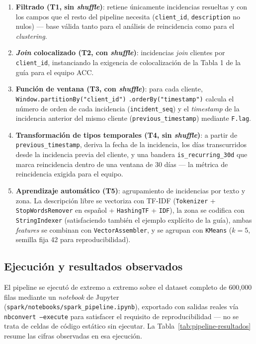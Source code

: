 \documentclass[11pt,letterpaper]{article}
\begin{document}
\begin{enumerate}[leftmargin=1.5em]
    \item \textbf{Filtrado (T1, sin \emph{shuffle})}: retiene únicamente incidencias resueltas y
        con los campos que el resto del pipeline necesita (\texttt{client\_id},
        \texttt{description} no nulos) — base válida tanto para el análisis de reincidencia como
        para el \emph{clustering}.
    \item \textbf{\emph{Join} colocalizado (T2, con \emph{shuffle})}: incidencias \emph{join}
        clientes por \texttt{client\_id}, instanciando la exigencia de colocalización de la
        Tabla 1 de la guía para el equipo ACC.
    \item \textbf{Función de ventana (T3, con \emph{shuffle})}: para cada cliente,
        \texttt{Window.partitionBy("client\_id")} \texttt{.orderBy("timestamp")} calcula el número de
        orden de cada incidencia (\texttt{incident\_seq}) y el \emph{timestamp} de la incidencia
        anterior del mismo cliente (\texttt{previous\_timestamp}) mediante \texttt{F.lag}.
    \item \textbf{Transformación de tipos temporales (T4, sin \emph{shuffle})}: a partir de
        \texttt{previous\_timestamp}, deriva la fecha de la incidencia, los días transcurridos
        desde la incidencia previa del cliente, y una bandera \texttt{is\_recurring\_30d} que
        marca reincidencia dentro de una ventana de 30 días — la métrica de reincidencia exigida
        para el equipo.
    \item \textbf{Aprendizaje automático (T5)}: agrupamiento de incidencias por texto y zona.
        La descripción libre se vectoriza con TF-IDF
        (\texttt{Tokenizer} + \texttt{StopWordsRemover} en español + \texttt{HashingTF} + \texttt{IDF}),
        la zona se codifica con \texttt{StringIndexer} (satisfaciendo también el ejemplo explícito
        de la guía), ambas \emph{features} se combinan con \texttt{VectorAssembler}, y se agrupan
        con \texttt{KMeans} ($k=5$, semilla fija 42 para reproducibilidad).
\end{enumerate}

\subsection{Ejecución y resultados observados}

El pipeline se ejecutó de extremo a extremo sobre el dataset completo de 600{,}000 filas mediante
un \emph{notebook} de Jupyter (\texttt{spark/notebooks/spark\_pipeline.ipynb}), exportado con
salidas reales vía \texttt{nbconvert --execute} para satisfacer el requisito de reproducibilidad —
no se trata de celdas de código estático sin ejecutar. La Tabla~\ref{tab:pipeline-resultados}
resume las cifras observadas en esa ejecución.
\end{document}
